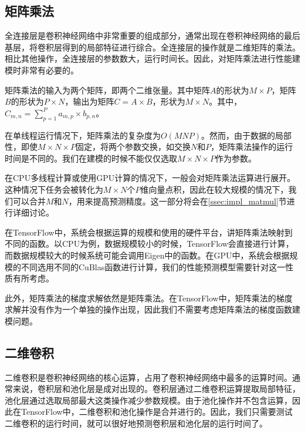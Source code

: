 \subsection{矩阵乘法}
\label{ssec:view_matmul}
    全连接层是卷积神经网络中非常重要的组成部分，通常出现在卷积神经网络的最后基层，将卷积层得到的局部特征进行综合。全连接层的操作就是二维矩阵的乘法。相比其他操作，全连接层的参数数大，运行时间长。因此，对矩阵乘法进行性能建模时非常有必要的。
    
    矩阵乘法的输入为两个矩阵，即两个二维张量。其中矩阵$ A $的形状为$ M \times P $，矩阵$ B $的形状为$ P \times N $，输出为矩阵$ C = A \times B $，形状为$M \times N$。其中，$ C_{m, n} = \sum_{p=1}^P{a_{m, p} \times b_{p, n}} $。
    
    在单线程运行情况下，矩阵乘法的复杂度为$ O(M N P) $。然而，由于数据的局部性，即使$ M \times N \times P $固定，将两个参数交换，如交换$ N $和$ P $，矩阵乘法操作的运行时间是不同的。我们在建模的时候不能仅仅选取$ M \times N \times P $作为参数。
    
    在CPU多线程计算或使用GPU计算的情况下，一般会对矩阵乘法运算进行展开。这种情况下任务会被转化为$ M \times N $个$ P $维向量点积，因此在较大规模的情况下，我们可以合并$ M $和$ N $，用来提高预测精度。这一部分将会在\ref{ssec:impl_matmul}节进行详细讨论。

    在TensorFlow中，系统会根据运算的规模和使用的硬件平台，讲矩阵乘法映射到不同的函数。以CPU为例，数据规模较小的时候，TensorFlow会直接进行计算，而数据规模较大的时候系统可能会调用Eigen\cite{eigen}中的函数。在GPU中，系统会根据规模的不同选用不同的CuBlas函数进行计算，我们的性能预测模型需要针对这一性质有所考虑。

    此外，矩阵乘法的梯度求解依然是矩阵乘法。在TensorFlow中，矩阵乘法的梯度求解并没有作为一个单独的操作出现，因此我们不需要考虑矩阵乘法的梯度函数建模问题。


\subsection{二维卷积}
\label{ssec:view_conv}
    二维卷积是卷积神经网络的核心运算，占用了卷积神经网络中最多的运算时间。通常来说，卷积层和池化层是成对出现的。卷积层通过二维卷积运算提取局部特征，池化层通过选取局部最大这类操作减少参数规模。由于池化操作并不包含运算，因此在TensorFlow中，二维卷积和池化操作是合并进行的。因此，我们只需要测试二维卷积的运行时间，就可以很好地预测卷积层和池化层的运行时间了。

